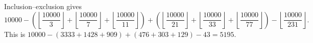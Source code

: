 Inclusion--exclusion gives
\[10000-\left(\left\lfloor\dfrac{10000}{3}\right\rfloor+\left\lfloor\dfrac{10000}{7}\right\rfloor+\left\lfloor\dfrac{10000}{11}\right\rfloor\right)+\left(\left\lfloor\dfrac{10000}{21}\right\rfloor+\left\lfloor\dfrac{10000}{33}\right\rfloor+\left\lfloor\dfrac{10000}{77}\right\rfloor\right)-\left\lfloor\dfrac{10000}{231}\right\rfloor.\]
This is $10000-(3333+1428+909)+(476+303+129)-43=\boxed{5195}$.
